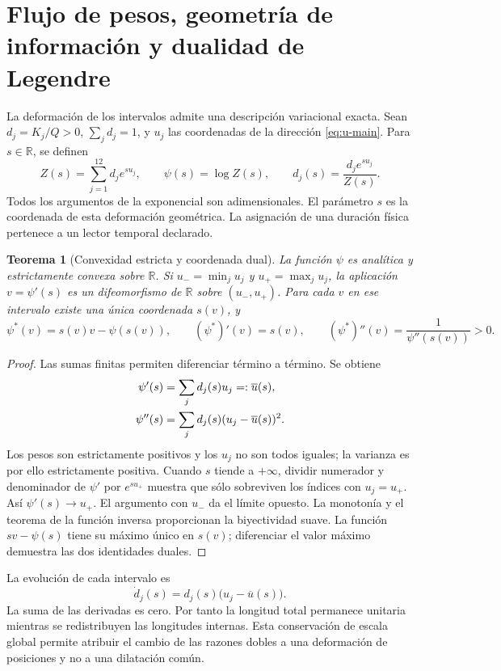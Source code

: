 \documentclass[a4paper,10pt]{article}
\newtheorem{theorem}{Teorema}[section]
\theoremstyle{definition}\newtheorem{definition}[theorem]{Definición}
\theoremstyle{remark}\newtheorem{remark}[theorem]{Observación}
\newcommand{\RR}{\mathbb R}\newcommand{\QQ}{\mathbb Q}
\numberwithin{equation}{section}
\begin{document}
\section{Flujo de pesos, geometría de información y dualidad de Legendre}
\label{sec:convex-refinement}

La deformación de los intervalos admite una descripción variacional
exacta. Sean \(d_j=K_j/Q>0\), \(\sum_jd_j=1\), y \(u_j\) las
coordenadas de la dirección \eqref{eq:u-main}. Para \(s\in\RR\),
se definen
\begin{equation}
 Z(s)=\sum_{j=1}^{12}d_j e^{su_j},\qquad
 \psi(s)=\log Z(s),\qquad
 d_j(s)=\frac{d_j e^{su_j}}{Z(s)}.
 \label{eq:convex-partition}
\end{equation}
Todos los argumentos de la exponencial son adimensionales. El parámetro
\(s\) es la coordenada de esta deformación geométrica. La asignación de
una duración física pertenece a un lector temporal declarado.

\begin{theorem}[Convexidad estricta y coordenada dual]
La función \(\psi\) es analítica y estrictamente convexa sobre \(\RR\).
Si \(u_- =\min_j u_j\) y \(u_+=\max_j u_j\), la aplicación
\(v=\psi'(s)\) es un difeomorfismo de \(\RR\) sobre \((u_-,u_+)\).
Para cada \(v\) en ese intervalo existe una única coordenada \(s(v)\), y
\[
 \psi^*(v)=s(v)v-\psi(s(v)),\qquad
 (\psi^*)'(v)=s(v),\qquad
 (\psi^*)''(v)=\frac1{\psi''(s(v))}>0.
\]
\end{theorem}
\begin{proof}
Las sumas finitas permiten diferenciar término a término. Se obtiene
\begin{align}
 \psi'(s)&=\sum_jd_j(s)u_j=:\overline u(s),\notag\\
 \psi''(s)&=\sum_jd_j(s)(u_j-\overline u(s))^2.
 \label{eq:variance}
\end{align}
Los pesos son estrictamente positivos y los \(u_j\) no son todos iguales;
la varianza es por ello estrictamente positiva. Cuando \(s\) tiende a
\(+\infty\), dividir numerador y denominador de \(\psi'\) por
\(e^{su_+}\) muestra que sólo sobreviven los índices con \(u_j=u_+\).
Así \(\psi'(s)\to u_+\). El argumento con \(u_-\) da el límite
opuesto. La monotonía y el teorema de la función inversa proporcionan la
biyectividad suave. La función \(sv-\psi(s)\) tiene su máximo único
en \(s(v)\); diferenciar el valor máximo demuestra las dos identidades
duales.
\end{proof}

La evolución de cada intervalo es
\begin{equation}
 \dot d_j(s)=d_j(s)\bigl(u_j-\overline u(s)\bigr).
 \label{eq:replicator}
\end{equation}
La suma de las derivadas es cero. Por tanto la longitud total permanece
unitaria mientras se redistribuyen las longitudes internas. Esta conservación
de escala global permite atribuir el cambio de las razones dobles a una
deformación de posiciones y no a una dilatación común.
\end{document}
